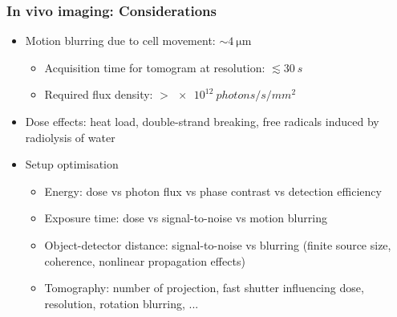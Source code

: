 \documentclass{beamer}
\begin{document}
\begin{frame}
  \frametitle{In vivo imaging: Considerations}
  \begin{itemize}

  \item Motion blurring due to cell movement: $\sim \SI{4}{\micro\metre}$
    \begin{itemize}
    \item Acquisition time for tomogram at  resolution: $\lesssim \SI{30}{s}$
    \item Required flux density: $> \SI{e12}{photons/s/mm^2}$
    \end{itemize}

  \item Dose effects: heat load, double-strand breaking, free radicals
    induced by radiolysis of water

  \item Setup optimisation
    \begin{itemize}
    \item Energy: dose vs photon flux vs phase contrast vs detection efficiency
    \item Exposure time: dose vs signal-to-noise vs motion blurring
    \item Object-detector distance: signal-to-noise vs blurring
      (finite source size, coherence, nonlinear propagation effects)
    \item Tomography: number of projection, fast shutter influencing
      dose, resolution, rotation blurring, ...
    \end{itemize}

  \end{itemize}
\end{frame}
\end{document}
